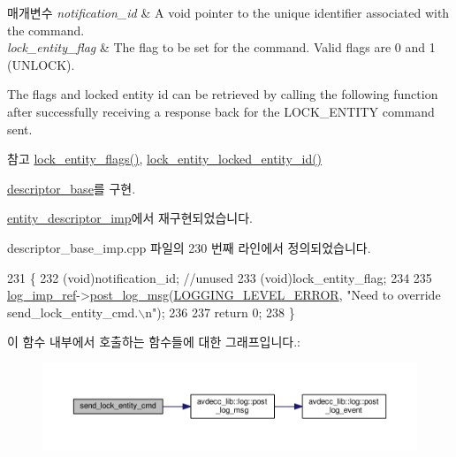 \begin{DoxyParams}{매개변수}
{\em notification\+\_\+id} & A void pointer to the unique identifier associated with the command. \\
\hline
{\em lock\+\_\+entity\+\_\+flag} & The flag to be set for the command. Valid flags are 0 and 1 (U\+N\+L\+O\+CK).\\
\hline
\end{DoxyParams}
The flags and locked entity id can be retrieved by calling the following function after successfully receiving a response back for the L\+O\+C\+K\+\_\+\+E\+N\+T\+I\+TY command sent.

\begin{DoxySeeAlso}{참고}
\hyperlink{classavdecc__lib_1_1descriptor__base__imp_afe2564a2a32f83deced28efa17f332e2}{lock\+\_\+entity\+\_\+flags()}, \hyperlink{classavdecc__lib_1_1descriptor__base__imp_aeb8f096d55f82522516cbf00a616246a}{lock\+\_\+entity\+\_\+locked\+\_\+entity\+\_\+id()} 
\end{DoxySeeAlso}


\hyperlink{classavdecc__lib_1_1descriptor__base_a1ac1f5c700f4eebd37b7c45498b36bbc}{descriptor\+\_\+base}를 구현.



\hyperlink{classavdecc__lib_1_1entity__descriptor__imp_a26fd66d8c409502eaa4dba47742ca7fa}{entity\+\_\+descriptor\+\_\+imp}에서 재구현되었습니다.



descriptor\+\_\+base\+\_\+imp.\+cpp 파일의 230 번째 라인에서 정의되었습니다.


\begin{DoxyCode}
231 \{
232     (void)notification\_id; \textcolor{comment}{//unused}
233     (void)lock\_entity\_flag;
234 
235     \hyperlink{namespaceavdecc__lib_acbe3e2a96ae6524943ca532c87a28529}{log\_imp\_ref}->\hyperlink{classavdecc__lib_1_1log_a68139a6297697e4ccebf36ccfd02e44a}{post\_log\_msg}(\hyperlink{namespaceavdecc__lib_a501055c431e6872ef46f252ad13f85cdaf2c4481208273451a6f5c7bb9770ec8a}{LOGGING\_LEVEL\_ERROR}, \textcolor{stringliteral}{"Need to
       override send\_lock\_entity\_cmd.\(\backslash\)n"});
236 
237     \textcolor{keywordflow}{return} 0;
238 \}
\end{DoxyCode}


이 함수 내부에서 호출하는 함수들에 대한 그래프입니다.\+:
\nopagebreak
\begin{figure}[H]
\begin{center}
\leavevmode
\includegraphics[width=350pt]{classavdecc__lib_1_1descriptor__base__imp_a26fd66d8c409502eaa4dba47742ca7fa_cgraph}
\end{center}
\end{figure}




